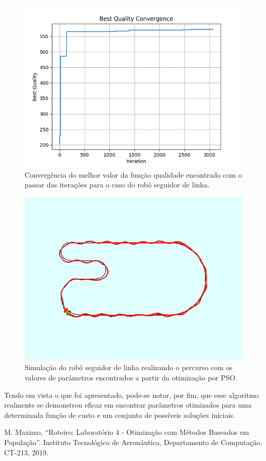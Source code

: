 \documentclass[conference]{IEEEtran}
\begin{document}
\begin{figure}[htbp]
\centering
\centerline{\includegraphics[scale=0.4]{line_best_convergence.png}}
\caption{Convergência do melhor valor da função qualidade encontrado com o passar das iterações para o caso do robô seguidor de linha.}
\label{line_best_convergence}
\end{figure}

\begin{figure}[htbp]
\centering
\centerline{\includegraphics[scale=0.3]{line_follower_solution.jpeg}}
\caption{Simulação do robô seguidor de linha realizando o percurso com os valores de parâmetros encontrados a partir da otimização por PSO.}
\label{line_follower_solution}
\end{figure}

Tendo em vista o que foi apresentado, pode-se notar, por fim, que esse algoritmo realmente se demonstrou eficaz em encontrar parâmetros otimizados para uma determinada função de custo e um conjunto de possíveis soluções iniciais.

\begin{thebibliography}{00}
 M. Maximo, ``Roteiro: Laboratório 4 - Otimização com Métodos Baseados em População''. Instituto Tecnológico de Aeronáutica, Departamento de Computação. CT-213, 2019.
\end{thebibliography}
\end{document}
